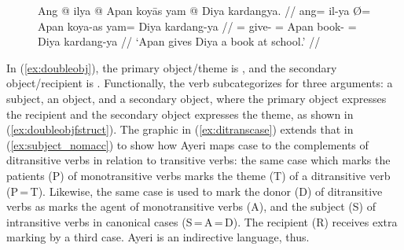 \begin{figure}
\pex\label{ex:doubleobj}
\a\label{ex:doubleobj_1}\begingl
	\gla Ang @ ilya {} @ Apan koyās yam @ Diya kardangya. //
	\glb ang= il-ya Ø= Apan koya-as yam= Diya kardang-ya //
	\glc \AgtT{}= give-\TsgM{} \Top{}= Apan book-\Parg{} \Dat{}= Diya
	kardang-ya //
	\glft `Apan gives Diya a book at school.' //
\endgl

\a\label{ex:doubleobj_2}\ljudge*%
\xe
\end{figure}

In (\ref{ex:doubleobj}), the primary object/theme is , and the secondary object/re\-cip\-i\-ent is . Functionally, the verb
subcategorizes for three arguments: a subject, an object, and a secondary object,
where the primary object expresses the recipient and the secondary object expresses the
theme, as shown in (\ref{ex:doubleobjfstruct}). The graphic in
(\ref{ex:ditranscase}) extends that in (\ref{ex:subject_nomacc}) to show how
Ayeri maps case to the complements of ditransitive verbs in relation to
transitive verbs: the same case which marks the patients (P) of monotransitive
verbs marks the theme (T) of a ditransitive verb (P\,=\,T). Likewise,
the same case is used to mark the donor (D) of ditransitive verbs as marks the agent of
monotransitive verbs (A), and the subject (S) of intransitive verbs in
canonical cases (S\,=\,A\,=\,D). The recipient (R) receives extra marking by a third case.
Ayeri is an indirective language, thus.

